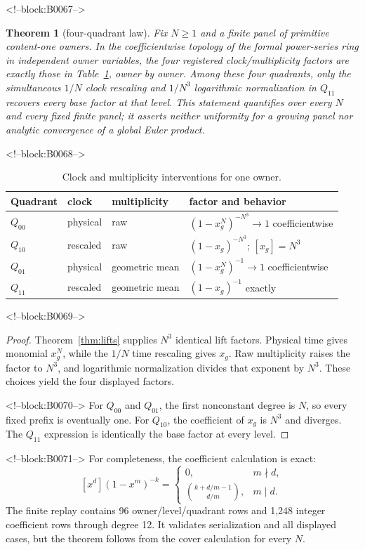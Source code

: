 \documentclass[11pt]{article}
\newtheorem{theorem}{Theorem}[section]
\theoremstyle{definition}
\theoremstyle{remark}
\begin{document}
<!--block:B0067-->
\begin{theorem}[four-quadrant law]\label{thm:quadrants}
Fix $N\geq1$ and a finite panel of primitive content-one owners. In the coefficientwise topology of the formal power-series ring in independent owner variables, the four registered clock/multiplicity factors are exactly those in Table~\ref{tab:quadrants}, owner by owner. Among these four quadrants, only the simultaneous $1/N$ clock rescaling and $1/N^3$ logarithmic normalization in $Q_{11}$ recovers every base factor at that level. This statement quantifies over every $N$ and every fixed finite panel; it asserts neither uniformity for a growing panel nor analytic convergence of a global Euler product.
\end{theorem}

<!--block:B0068-->
\begin{table}[ht]
\centering
\caption{Clock and multiplicity interventions for one owner.}
\label{tab:quadrants}
\begin{tabular}{llll}
\toprule
Quadrant & clock & multiplicity & factor and behavior\\
\midrule
$Q_{00}$ & physical & raw & $(1-x_g^N)^{-N^3}\to1$ coefficientwise\\
$Q_{10}$ & rescaled & raw & $(1-x_g)^{-N^3}$; $[x_g]=N^3$\\
$Q_{01}$ & physical & geometric mean & $(1-x_g^N)^{-1}\to1$ coefficientwise\\
$Q_{11}$ & rescaled & geometric mean & $(1-x_g)^{-1}$ exactly\\
\bottomrule
\end{tabular}
\end{table}

<!--block:B0069-->
\begin{proof}
Theorem~\ref{thm:lifts} supplies $N^3$ identical lift factors. Physical time gives monomial $x_g^N$, while the $1/N$ time rescaling gives $x_g$. Raw multiplicity raises the factor to $N^3$, and logarithmic normalization divides that exponent by $N^3$. These choices yield the four displayed factors.

<!--block:B0070-->
For $Q_{00}$ and $Q_{01}$, the first nonconstant degree is $N$, so every fixed prefix is eventually one. For $Q_{10}$, the coefficient of $x_g$ is $N^3$ and diverges. The $Q_{11}$ expression is identically the base factor at every level.
\end{proof}

<!--block:B0071-->
For completeness, the coefficient calculation is exact:
\[
[x^d](1-x^m)^{-k}=
\begin{cases}
0,&m\nmid d,\\
\binom{k+d/m-1}{d/m},&m\mid d.
\end{cases}
\]
The finite replay contains 96 owner/level/quadrant rows and 1,248 integer coefficient rows through degree 12. It validates serialization and all displayed cases, but the theorem follows from the cover calculation for every $N$.
\end{document}
